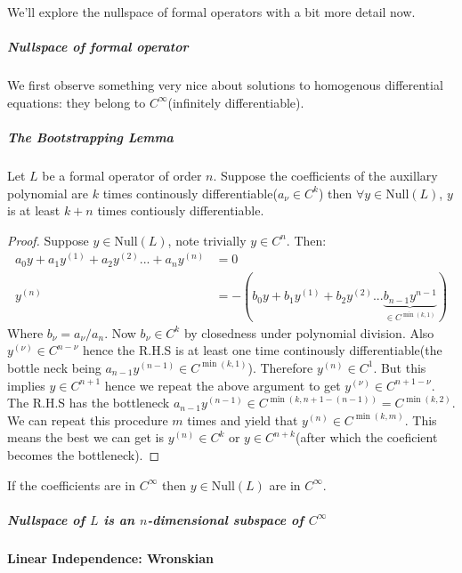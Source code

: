 We'll explore the nullspace of formal operators with a bit more detail now.

\subparagraph{Nullspace of formal operator}

We first observe something very nice about solutions to homogenous differential equations: they belong to $C^{\infty}$(infinitely differentiable).

\subparagraph{The Bootstrapping Lemma}

\begin{lemma}Let $L$ be a formal operator of order $n$. Suppose the coefficients of the auxillary polynomial are $k$ times continously differentiable($a_{\nu}\in C^k$) then $\forall y\in \mathrm{Null}(L)$, $y$ is at least $k+n$ times contiously differentiable.

\end{lemma}\begin{proof}Suppose $y\in \mathrm{Null}(L)$, note trivially $y\in C^n$. Then:
\begin{equation}
\begin{aligned}
a_0y+a_1y^{(1)}+a_2y^{(2)}...+a_n y^{(n)} &=0 \\
y^{(n)} &= -(b_0y+b_1y^{(1)}+b_2y^{(2)}...\underbrace{b_{n-1}{y}^{n-1}}_{\in C^{\min(k, 1)}})
\end{aligned}
\end{equation}
Where $b_{\nu}=a_{\nu}/a_{n}$. Now $b_{\nu}\in C^k$ by closedness under polynomial division. Also $y^{(\nu)} \in C^{n -\nu}$ hence the R.H.S is at least one time continously differentiable(the bottle neck being $a_{n -1}y^{(n -1)} \in C^{\min(k, 1)}$). Therefore $y^{(n)}\in C^1$. But this implies $y\in C^{n+1}$ hence we repeat the above argument to get $y^{(\nu)}\in C^{n+1 -\nu}$. The R.H.S has the bottleneck $a_{n -1}y^{(n -1)}\in C^{\min(k, n+1 -(n -1))}=C^{\min(k, 2)}$. We can repeat this procedure $m$ times and yield that $y^{(n)}\in C^{\min(k, m)}$. This means the best we can get is $y^{(n)}\in C^k$ or $y\in C^{n+k}$(after which the coeficient becomes the bottleneck).

\end{proof}\begin{corollary}If the coefficients are in $C^{\infty}$ then $y\in \mathrm{Null}(L)$ are in $C^{\infty}$.

\end{corollary}\subparagraph{Nullspace of $L$ is an $n$-dimensional subspace of $C^{\infty}$}

\paragraph{Linear Independence: Wronskian}


